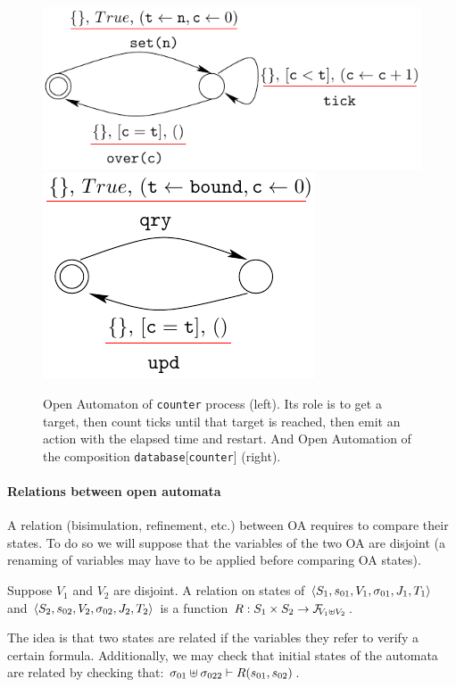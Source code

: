 \documentclass[runningheads]{llncs}
\begin{document}
\begin{figure}[h]
 \centering
   \includegraphics[width=.5\textwidth]{Figures/counter.pdf}\hfill 
   \includegraphics[width=.3\textwidth]{Figures/compose_count_db.pdf}
   \caption{Open Automaton of \texttt{counter} process (left).  Its role is to get a target, then count ticks until that target is reached, then emit an action with the elapsed time and restart. And Open Automation of  the composition \texttt{database}[\texttt{counter}] (right).\label{Fig:counter}}
\end{figure}


\paragraph{Relations between open automata}
A relation (bisimulation, refinement, etc.) between OA requires to compare their states. To do so we will suppose that the variables of the two OA are disjoint (a renaming of variables may have to be applied before comparing OA states).
\begin{definition} Suppose $V_1$ and $V_2$ are disjoint.
A relation on states of \(\OAg[1]\) and \(\OAg[2]\) is a function \(R: S_1 \times S_2 \to \rformulas[V_1 \uplus V_2]\).
\end{definition}
The idea is that two states are related if the variables they refer to verify a certain formula. Additionally, we may check that initial states of the automata are related by checking that: \(\sigma_{01} \uplus \sigma_{022} \vdash R\mpar{s_{01}, s_{02}}\).

\end{document}
